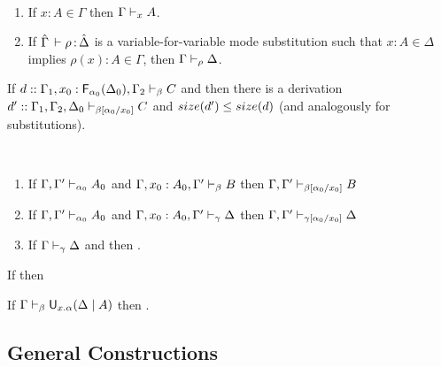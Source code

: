 \begin{theorem}[Identity] ~ \label{thm:identity}
\begin{enumerate}
\item If $x:A \in \Gamma$ then $\Gamma \vdash_{x} A$.
\item If $\hat{\Gamma} \, \vdash \rho \, \mathit{:} \, \hat{\Delta}$ is a
  variable-for-variable mode substitution such that $x:A \in \Delta$
  implies $\rho(x) : A \in \Gamma$, then $\Gamma \vdash_{\rho} \Delta$.
\end{enumerate}
\end{theorem}

\begin{lemma} \label{lem:Finv}
If $d :: \Gamma_1,x_0:\mathsf{F}_{\alpha_0}(\Delta_0),\Gamma_2 \vdash_{\beta} C$
and then there is a derivation $d' ::
\Gamma_1,\Gamma_2,\Delta_0 \vdash_{\beta[\alpha_0/x_0]} C$ and
$size(d') \le size(d)$ (and analogously for substitutions).
\end{lemma}

\begin{theorem}[Cut] ~ \label{thm:cut}
\begin{enumerate} 
\item  If $\Gamma,\Gamma' \vdash_{\alpha_0} A_0$ and $\Gamma,x_0:A_0,\Gamma' \vdash_{\beta} B$ 
then $\Gamma,\Gamma' \vdash_{\beta[\alpha_0/x_0]} B$ 
\item If $\Gamma,\Gamma' \vdash_{\alpha_0} A_0$ and $\Gamma,x_0:A_0,\Gamma' \vdash_{\gamma} \Delta$ 
then $\Gamma,\Gamma' \vdash_{\gamma[\alpha_0/x_0]} \Delta$ 
\item If $\Gamma \vdash_{\gamma} \Delta$ and 
then .  
\end{enumerate}
\end{theorem}

\begin{corollary} \label{cor:contraction}
\item If
then
\end{corollary}

\begin{corollary} \label{cor:Uinv}
If $\Gamma \vdash_{\beta} \mathsf{U}_{x.\alpha}(\Delta \mid A)$ then 
{}.
\end{corollary}

\subsection{General Constructions}

